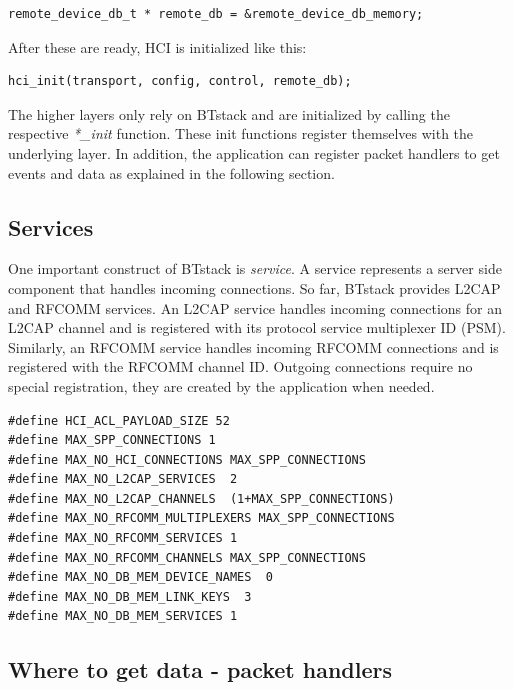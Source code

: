 \documentclass[a4paper,titlepage,oneside,12pt]{amsart} %
\begin{document}
\begin{lstlisting}
remote_device_db_t * remote_db = &remote_device_db_memory;
\end{lstlisting}


After these are ready, HCI is initialized like this:
\begin{lstlisting}
hci_init(transport, config, control, remote_db);
\end{lstlisting}

The higher layers only rely on BTstack and are initialized by calling the respective \emph{*\_init} function. These init functions register themselves with the underlying layer. In addition, the application can register packet handlers to get events and data as explained in the following section.


\subsection{Services}
One important construct of BTstack is \emph{service}. A service represents a server side component that handles incoming connections. So far, BTstack provides L2CAP and RFCOMM services. An L2CAP service handles incoming connections for an L2CAP channel and is registered with its protocol service multiplexer ID (PSM). Similarly,  an RFCOMM service handles incoming RFCOMM connections and is registered with the RFCOMM channel ID. Outgoing connections require no special registration, they are created by the application when needed. 

\noindent\begin{minipage}{\textwidth}
\begin{lstlisting}[caption=Memory configuration for an SPP service with a minimal L2CAP MTU., label=memoryConfigurationSPP]
#define HCI_ACL_PAYLOAD_SIZE 52
#define MAX_SPP_CONNECTIONS 1
#define MAX_NO_HCI_CONNECTIONS MAX_SPP_CONNECTIONS
#define MAX_NO_L2CAP_SERVICES  2
#define MAX_NO_L2CAP_CHANNELS  (1+MAX_SPP_CONNECTIONS)
#define MAX_NO_RFCOMM_MULTIPLEXERS MAX_SPP_CONNECTIONS
#define MAX_NO_RFCOMM_SERVICES 1
#define MAX_NO_RFCOMM_CHANNELS MAX_SPP_CONNECTIONS
#define MAX_NO_DB_MEM_DEVICE_NAMES  0
#define MAX_NO_DB_MEM_LINK_KEYS  3
#define MAX_NO_DB_MEM_SERVICES 1
\end{lstlisting}
\end{minipage}

\subsection{Where to get data - packet handlers}
\label{section:packetHandlers}
\end{document}
